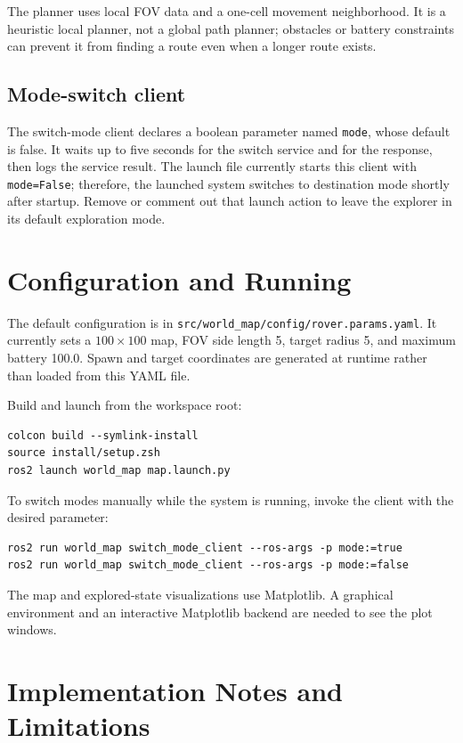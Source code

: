 \documentclass[11pt,a4paper]{article}
\begin{document}
The planner uses local FOV data and a one-cell movement neighborhood. It is a
heuristic local planner, not a global path planner; obstacles or battery
constraints can prevent it from finding a route even when a longer route
exists.

\subsection{Mode-switch client}

The switch-mode client declares a boolean parameter named \texttt{mode}, whose
default is false. It waits up to five seconds for the switch service and for
the response, then logs the service result. The launch file currently starts
this client with \texttt{mode=False}; therefore, the launched system switches
to destination mode shortly after startup. Remove or comment out that launch
action to leave the explorer in its default exploration mode.

\section{Configuration and Running}

The default configuration is in
\texttt{src/world\_map/config/rover.params.yaml}. It currently sets a
\(100\times100\) map, FOV side length 5, target radius 5, and maximum battery
100.0. Spawn and target coordinates are generated at runtime rather than
loaded from this YAML file.

Build and launch from the workspace root:
\begin{lstlisting}
colcon build --symlink-install
source install/setup.zsh
ros2 launch world_map map.launch.py
\end{lstlisting}

To switch modes manually while the system is running, invoke the client with
the desired parameter:
\begin{lstlisting}
ros2 run world_map switch_mode_client --ros-args -p mode:=true
ros2 run world_map switch_mode_client --ros-args -p mode:=false
\end{lstlisting}

The map and explored-state visualizations use Matplotlib. A graphical
environment and an interactive Matplotlib backend are needed to see the plot
windows.

\section{Implementation Notes and Limitations}
\end{document}
